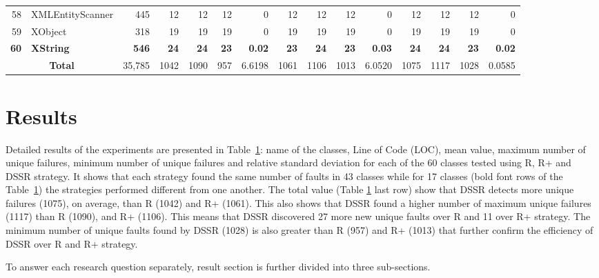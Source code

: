 \documentclass{acm_proc_article-sp}
\begin{document}
\begin{table} [htp!]
{\begin{tabularx}{1 \textwidth}{r l r r r r r r r r r r r r r}
58						& XMLEntityScanner			&445		& 12		&	12	&	12	& 	0					& 12		&  12		& 12		& 		0			& 12			& 12			& 12			&	0\\      
59						& XObject					&318		& 19		&	19	&	19	& 	0					& 19		&  19		& 19		& 		0			& 19			& 19			& 19			&	0\\      
\textbf{60}						& \textbf{XString}					&\textbf{546}		& \textbf{24}		&	\textbf{24}	&	\textbf{23}	& 	\textbf{0.02}					& \textbf{23}		&  \textbf{24}		& \textbf{23}		& 		\textbf{0.03}			& \textbf{24}			& \textbf{24}			& \textbf{23}			&	\textbf{0.02}\\      

    						\multicolumn{2}{c}{\textbf{Total}}	&35,785	&1042	&	1090	&    957	&	6.6198				& 1061	&1106	&1013	&		6.0520		& 1075		& 1117		& 1028		& 	0.0585\\
     \end{tabularx} }
    \bigskip
    \label{table:Results}
\end{table}

\section{Results}\label{sec:res}
Detailed results of the experiments are presented in Table~\ref{table:Results}: name of the classes, Line of Code (LOC), mean value, maximum number of unique failures, minimum number of unique failures and relative standard deviation for each of the 60 classes tested using R, R+ and DSSR strategy. It shows that each strategy found the same number of faults in 43 classes while for 17 classes (bold font rows of the Table~\ref{table:Results}) the strategies performed different from one another. The total value (Table \ref{table:Results} last row) show that DSSR detects more unique failures (1075), on average, than R (1042) and R+ (1061). This also shows that DSSR found a higher number of maximum unique failures (1117) than R (1090), and R+ (1106). This means that DSSR discovered 27 more new unique faults over R and 11 over R+ strategy. The minimum number of unique faults found by DSSR (1028) is also greater than R (957) and R+ (1013) that further confirm the efficiency of DSSR over R and R+ strategy.

To answer each research question separately, result section is further divided into three sub-sections.
\end{document}
